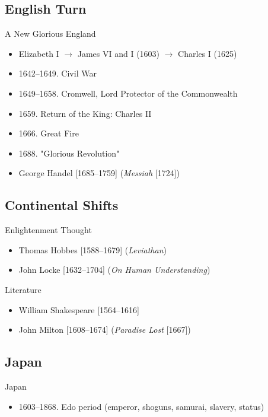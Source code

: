 \subsection{English Turn}
\begin{frame}{A New Glorious England}
	\begin{itemize}
		\item<1->Elizabeth I $\rightarrow$ James VI and I (1603) $\rightarrow$ Charles I (1625)
		\item<2->1642--1649. Civil War
		\item<3->1649--1658. Cromwell, Lord Protector of the Commonwealth
		\item<4->1659. Return of the King: Charles II
		\item<5->1666. Great Fire
		\item<6->1688. "Glorious Revolution"
		\item<7->George Handel [1685--1759] (\emph{Messiah} [1724])
	\end{itemize}
\end{frame}

\subsection{Continental Shifts}
\begin{frame}{Enlightenment Thought}
	\begin{itemize}
		\item<1->Thomas Hobbes [1588--1679] (\emph{Leviathan})
		\item<2->John Locke [1632--1704] (\emph{On Human Understanding})
	\end{itemize}
\end{frame}

\begin{frame}{Literature}
	\begin{itemize}
		\item<1->William Shakespeare [1564--1616]
		\item<2->John Milton [1608--1674] (\emph{Paradise Lost} [1667])
	\end{itemize}
\end{frame}

\subsection{Japan}
\begin{frame}{Japan}
	\begin{itemize}
		\item<1>1603--1868. Edo period (emperor, shoguns, samurai, slavery, status)
	\end{itemize}
\end{frame}